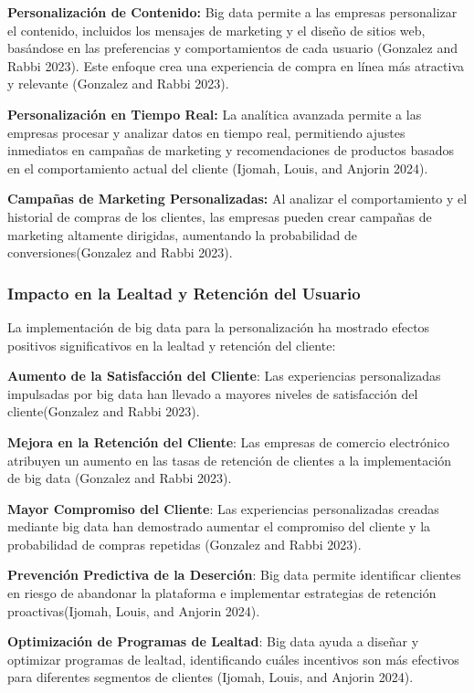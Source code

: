 \documentclass{article}
\begin{document}
\textbf{Personalización de Contenido:} Big data permite a las empresas personalizar el
contenido, incluidos los mensajes de marketing y el diseño de sitios
web, basándose en las preferencias y comportamientos de cada usuario
(Gonzalez and Rabbi 2023). Este enfoque crea una experiencia de compra
en línea más atractiva y relevante (Gonzalez and Rabbi 2023).

\textbf{Personalización en Tiempo Real:} La analítica avanzada permite a
las empresas procesar y analizar datos en tiempo real, permitiendo
ajustes inmediatos en campañas de marketing y recomendaciones de
productos basados en el comportamiento actual del cliente (Ijomah,
Louis, and Anjorin 2024). 

\textbf{Campañas de Marketing Personalizadas:}
Al analizar el comportamiento y el historial de compras de los clientes,
las empresas pueden crear campañas de marketing altamente dirigidas,
aumentando la probabilidad de conversiones(Gonzalez and Rabbi 2023).

\subsubsection{Impacto en la Lealtad y Retención del
Usuario}\label{impacto-en-la-lealtad-y-retenciuxf3n-del-usuario}

La implementación de big data para la personalización ha mostrado
efectos positivos significativos en la lealtad y retención del cliente:

\textbf{Aumento de la Satisfacción del Cliente}: Las experiencias
personalizadas impulsadas por big data han llevado a mayores niveles de
satisfacción del cliente(Gonzalez and Rabbi 2023).

\textbf{Mejora en la Retención del Cliente}: Las empresas de comercio
electrónico atribuyen un aumento en las tasas de retención de clientes a
la implementación de big data (Gonzalez and Rabbi 2023).

\textbf{Mayor Compromiso del Cliente}: Las experiencias personalizadas
creadas mediante big data han demostrado aumentar el compromiso del
cliente y la probabilidad de compras repetidas (Gonzalez and Rabbi
2023).

\textbf{Prevención Predictiva de la Deserción}: Big data permite
identificar clientes en riesgo de abandonar la plataforma e implementar
estrategias de retención proactivas(Ijomah, Louis, and Anjorin 2024).

\textbf{Optimización de Programas de Lealtad}: Big data ayuda a diseñar
y optimizar programas de lealtad, identificando cuáles incentivos son
más efectivos para diferentes segmentos de clientes (Ijomah, Louis, and
Anjorin 2024).
\end{document}
